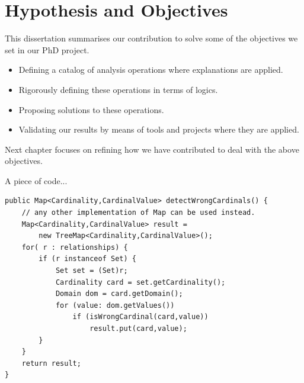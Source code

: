 \section{Hypothesis and Objectives}



This dissertation summarises our contribution to solve some of the objectives we set in our PhD project. 

\begin{itemize}
\item Defining a catalog of analysis operations where explanations are applied.
\item Rigorously defining these operations in terms of logics.
\item Proposing solutions to these operations.
\item Validating our results by means of tools and projects where they are applied. 
\end{itemize}

Next chapter focuses on refining how we have contributed to deal with the above objectives.

A piece of code...

\begin{lstlisting}[style=javacode,breaklines=true]
public Map<Cardinality,CardinalValue> detectWrongCardinals() {
	// any other implementation of Map can be used instead.
	Map<Cardinality,CardinalValue> result = 
		new TreeMap<Cardinality,CardinalValue>();
	for( r : relationships) {
		if (r instanceof Set) {
			Set set = (Set)r;
			Cardinality card = set.getCardinality();
			Domain dom = card.getDomain();
			for (value: dom.getValues())
				if (isWrongCardinal(card,value))
					result.put(card,value);
		}
	}
	return result;
}
\end{lstlisting}

